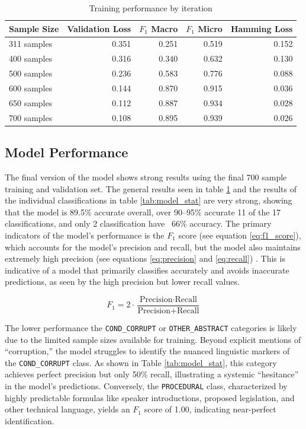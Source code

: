 \begin{table}[h]
    \centering
    \caption{Training performance by iteration}
    \begin{tabular}{lrrrr}
        \toprule
        Sample Size & Validation Loss & $F_1$ Macro & $F_1$ Micro & Hamming Loss \\
        \midrule
        311 samples & 0.351 & 0.251 & 0.519 & 0.152 \\
        400 samples & 0.316 & 0.340 & 0.632 & 0.130 \\
        500 samples & 0.236 & 0.583 & 0.776 & 0.088 \\
        600 samples & 0.144 & 0.870 & 0.915 & 0.036 \\
        650 samples & 0.112 & 0.887 & 0.934 & 0.028 \\
        700 samples & 0.108 & 0.895 & 0.939 & 0.026 \\
       \bottomrule 
    \end{tabular}
    \label{tab:training_results}
\end{table}



\subsection{Model Performance}
\label{subsec:model_performance}

The final version of the model shows strong results using the final 700 sample training and validation set. The general results seen in table \ref{tab:training_results} and the results of the individual classifications in table \ref{tab:model_stat} are very strong, showing that the model is 89.5\% accurate overall, over 90--95\% accurate 11 of the 17 classifications, and only 2 classification have ~66\% accuracy. The primary indicators of the model's performance is the $F_1$ score (see equation \ref{eq:f1_score}), which accounts for the model's precision and recall, but the model also maintains extremely high precision (see equations \ref{eq:precision} and \ref{eq:recall}) \citep{r.abas2022}. This is indicative of a model that primarily classifies accurately and avoids inaccurate predictions, as seen by the high precision but lower recall values.

\begin{equation} \label{eq:f1_score}
F_1 = 2 \cdot \frac{\text{Precision} \cdot \text{Recall}}{\text{Precision} + \text{Recall}}
\end{equation}

The lower performance the \texttt{COND\_CORRUPT} or \texttt{OTHER\_ABSTRACT} categories is likely due to the limited sample sizes available for training. Beyond explicit mentions of ``corruption,'' the model struggles to identify the nuanced linguistic markers of the \texttt{COND\_CORRUPT} class. As shown in Table \ref{tab:model_stat}, this category achieves perfect precision but only 50\% recall, illustrating a systemic ``hesitance'' in the model's predictions. Conversely, the \texttt{PROCEDURAL} class, characterized by highly predictable formulas like speaker introductions, proposed legislation, and other technical language, yields an $F_1$ score of 1.00, indicating near-perfect identification.

